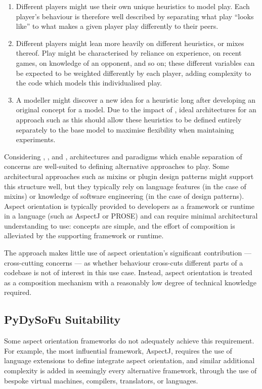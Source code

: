 \begin{enumerate}
    \item Different players might use their own unique heuristics to model play.
    Each player's behaviour is therefore well described by separating what play
    ``looks like'' to what makes a given player play differently to their peers.
    \item Different players might lean more heavily on different heuristics, or
    mixes thereof. Play might be characterised by reliance on experience, on
    recent games, on knowledge of an opponent, and so on; these different
    variables can be expected to be weighted differently by each player, adding
    complexity to the code which models this individualised play.
    \item A modeller might discover a new idea for a heuristic long after
    developing an original concept for a model. Due
    to the impact of , ideal architectures for an approach such as
    this should allow these heuristics to be defined entirely separately to
    the base model to maximise flexibility when maintaining experiments.
\end{enumerate}

Considering , , and , architectures and
paradigms which enable separation of concerns are well-suited to defining
alternative approaches to play. Some architectural approaches such as mixins or
plugin design patterns might support this structure well, but they typically
rely on language features (in the case of mixins) or knowledge of software
engineering (in the case of design patterns). Aspect orientation is typically
provided to developers as a framework or runtime in a language (such as
AspectJ\cite{aspectj_intro} or PROSE\cite{popovici2002PROSE}) and can require
minimal architectural understanding to use: concepts are simple, and the effort
of composition is alleviated by the supporting framework or runtime.

The approach makes little use of aspect orientation's significant contribution
--- cross-cutting concerns --- as whether behaviour cross-cuts different parts
of a codebase is not of interest in this use case. Instead, aspect orientation
is treated as a composition mechanism with a reasonably low degree of technical
knowledge required.

\subsection{PyDySoFu Suitability}\label{subsec:optimisation_with_aspects_usingpdsf}
Some aspect orientation frameworks do not adequately achieve this requirement.
For example, the most influential framework, AspectJ, requires the use of
language extensions to define integrate aspect
orientation\cite{AspectJLanguageAndTools}, and similar additional complexity is
added in seemingly every alternative framework, through the use of bespoke
virtual machines, compilers, translators, or
languages\cite{rajan2006nu_towardsAO_invocation,popovici2003JITaspects,AspectCplusplusDesignImpl,baker2002maya}.

